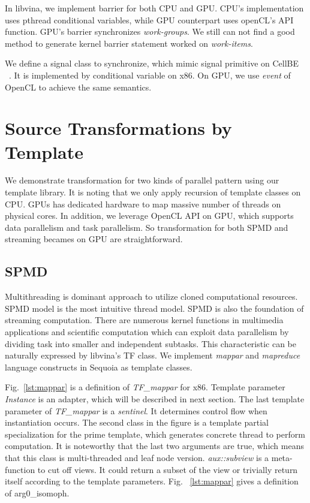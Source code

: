 \documentclass[10pt, conference, compsocconf]{IEEEtran}
\begin{document}
In libvina, we implement barrier for both CPU and GPU. CPU's
implementation uses pthread conditional variables, while GPU counterpart
uses openCL's API function. GPU's barrier synchronizes
\emph{work-groups}. We still can not find a good method to generate kernel
barrier statement worked on \emph{work-items}.

We define a signal class to synchronize, which mimic
signal primitive on CellBE ~\cite{cellnetwork}. It is implemented by
conditional variable on x86. On GPU, we use \emph{event} of OpenCL to
achieve the same semantics.

\section{Source Transformations by Template}
We demonstrate transformation for two kinds of parallel pattern using
our template library. It is noting that we only apply recursion of
template classes on CPU. GPUs has dedicated hardware to map massive
number of threads on physical cores. In addition, we leverage OpenCL API on GPU, which
supports data parallelism and task parallelism. So transformation for
both SPMD and streaming becames on GPU are straightforward.

\subsection{SPMD}
Multithreading is dominant approach to utilize cloned computational resources. SPMD model is the most intuitive thread model.  SPMD is also
the foundation of streaming computation. There are numerous kernel functions in
multimedia applications and scientific computation which can 
exploit data parallelism by dividing task into smaller and independent
subtasks. This characteristic can be naturally expressed by libvina's
TF class. We implement \emph{mappar} and \emph{mapreduce} language constructs in Sequoia as template classes.

Fig.~\ref{lst:mappar} is a definition of \emph{TF\_mappar} for
x86. Template parameter \emph{Instance} is an adapter, which will be
described in next section. The last template
parameter of \textit{TF\_mappar} is a \emph{sentinel}. It determines control flow when
instantiation occurs. The second class in the figure is a template partial
specialization for the prime template, which generates concrete thread
to perform computation. It is noteworthy that the last two arguments
are true, which means that this class is multi-threaded and
leaf node version. \textit{aux::subview} is a meta-function to cut off
views. It could return a subset of the view or trivially return itself
according to the template parameters. Fig. ~\ref{lst:mappar}
gives a definition of arg0\_isomoph.
\end{document}
